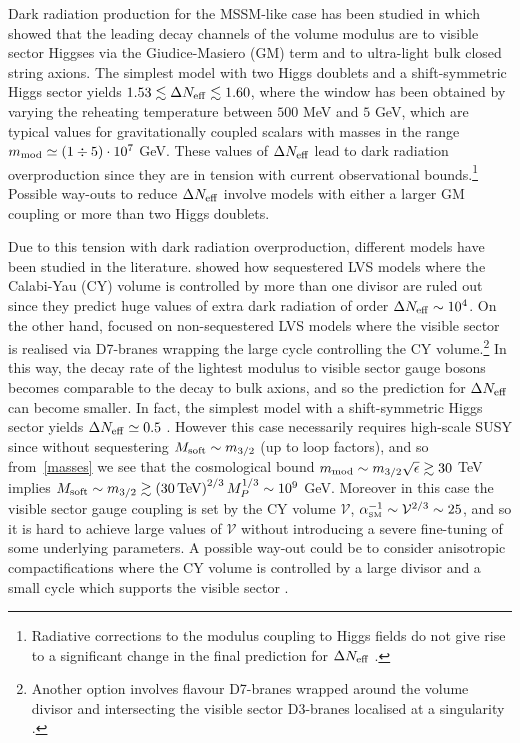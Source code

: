 \documentclass[11pt,a4paper]{article}
\def\SM{{\scriptscriptstyle \rm SM}}
\newcommand\vo{{\mathcal{V}}}
\begin{document}
Dark radiation production for the MSSM-like case has been studied in \cite{DR1, DR2} which showed that the leading decay channels of the volume modulus are to visible sector Higgses via the Giudice-Masiero (GM) term and to ultra-light bulk closed string axions. The simplest model with two Higgs doublets and a shift-symmetric Higgs sector yields $1.53 \lesssim \Delta N_{\rm eff}\lesssim 1.60$, where the window has been obtained by varying the reheating temperature between $500$ MeV and $5$ GeV, which are typical values for gravitationally coupled scalars with masses in the range $m_{\rm mod}\simeq (1 \div 5) \cdot 10^7$ GeV. These values of $\Delta N_{\rm eff}$ lead to dark radiation overproduction since they are in tension with current observational bounds.\footnote{Radiative corrections to the modulus coupling to Higgs fields do not give rise to a significant change in the final prediction for $\Delta N_{\rm eff}$ \cite{DRloop}.} Possible way-outs to reduce $\Delta N_{\rm eff}$ involve models with either a larger GM coupling or more than two Higgs doublets.

Due to this tension with dark radiation overproduction, different models have been studied in the literature. \cite{Angus:2014bia} showed how sequestered LVS models where the Calabi-Yau (CY) volume is controlled by more than one divisor are ruled out since they predict huge values of extra dark radiation of order $\Delta N_{\rm eff}\sim 10^4$. On the other hand, \cite{Hebecker:2014gka} focused on non-sequestered LVS models where the visible sector is realised via D7-branes wrapping the large cycle controlling the CY volume.\footnote{Another option involves flavour D7-branes wrapped around the volume divisor and intersecting the visible sector D3-branes localised at a singularity \cite{Hebecker:2014gka}.} In this way, the decay rate of the lightest modulus to visible sector gauge bosons becomes comparable to the decay to bulk axions, and so the prediction for $\Delta N_{\rm eff}$ can become smaller. In fact, the simplest model with a shift-symmetric Higgs sector yields $\Delta N_{\rm eff}\simeq 0.5$ \cite{Hebecker:2014gka}. However this case necessarily requires high-scale SUSY since without sequestering $M_{\rm soft}\sim m_{3/2}$ (up to loop factors), and so from~\eqref{masses} we see that the cosmological bound $m_{\rm mod}\sim m_{3/2} \sqrt{\epsilon}\gtrsim 30$ TeV implies $M_{\rm soft} \sim m_{3/2} \gtrsim \left(30\,{\rm TeV}\right)^{2/3} M_P^{1/3}\sim 10^9$ GeV. Moreover in this case the visible sector gauge coupling is set by the CY volume $\vo$, $\alpha_\SM^{-1} \sim \vo^{2/3} \sim 25$, and so it is hard to achieve large values of $\vo$ without introducing a severe fine-tuning of some underlying parameters. A possible way-out could be to consider anisotropic compactifications where the CY volume is controlled by a large divisor and a small cycle which supports the visible sector \cite{Cicoli:2011yy, Anis}.
\end{document}
